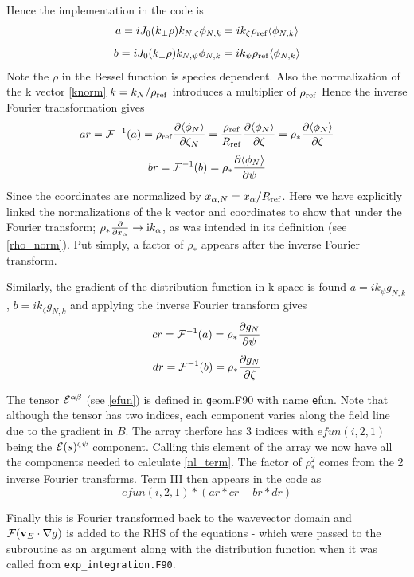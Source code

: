 \documentclass{report}
\def\be{\begin{equation}}
\def\ee{\end{equation}}
\begin{document}
Hence the implementation in the code is
\be
a = i J_{0}(k_{\perp}\rho) k_{N,\zeta} \phi_{N,k} = ik_{\zeta}\rho_{\rm ref}{\langle \phi_{N,k} \rangle} 
\ee
\be
b = i J_{0}(k_{\perp}\rho) k_{N,\psi} \phi_{N,k} = ik_{\psi}\rho_{\rm ref}{\langle \phi_{N,k} \rangle} 
\ee
Note the $\rho$ in the Bessel function is species dependent.  Also the normalization of the k vector \ref{knorm} $k = {k_N / \rho_{\rm ref}}$ introduces a multiplier of $\rho_{\rm ref}$
Hence the inverse Fourier transformation gives
\be
ar = \mathcal{F}^{-1}(a) =  \rho_{\rm ref} {\partial {\langle \phi_N \rangle} \over \partial \zeta_{N}} = {\rho_{\rm ref} \over R_{\rm ref}} {\partial {\langle \phi_N \rangle} \over \partial \zeta} =  \rho_* {\partial {\langle \phi_N \rangle} \over \partial \zeta}
\ee
\be
br = \mathcal{F}^{-1}(b) =  \rho_* {\partial {\langle \phi_N \rangle} \over \partial \psi}
\ee
Since the coordinates are normalized by $x_{\alpha,N} = {x_{\alpha} \slash R_{\rm ref}}$.  Here we have explicitly linked the normalizations of the k vector and coordinates to show that under the Fourier transform; $\rho_* {\partial \over \partial x_\alpha} \rightarrow {\rm i} k_\alpha$, as was intended in its definition (see \ref{rho_norm}). Put simply, a factor of $\rho_{*}$ appears after the inverse Fourier transform.

Similarly, the gradient of the distribution function in k space is found $a = i k_\psi g_{N,k}$, $b = i k_\zeta g_{N,k}$
and applying the inverse Fourier transform gives
\be
cr = \mathcal{F}^{-1}(a) = \rho_* {\partial g_N \over \partial \psi}
\ee
\be
dr = \mathcal{F}^{-1}(b) = \rho_* {\partial g_N \over \partial \zeta}
\ee

The tensor ${\cal E}^{\alpha \beta}$ (see \ref{efun}) is defined in {\texttt geom.F90} with name  {\texttt efun}. Note that although the tensor has two indices, each component varies along the field line due to the gradient in $B$. The array therfore has 3 indices with $efun{(i,2,1)}$ being the ${\cal E}(s)^{\zeta \psi}$ component. Calling this element of the array we now have all the components needed to calculate \ref{nl_term}.  The factor of $\rho_*^2$ comes from the 2 inverse Fourier transforms.  Term III then appears in the code as
\be
efun(i,2,1)*({ar*cr-br*dr})
\ee

Finally this is Fourier transformed back to the wavevector domain and $\mathcal{F}({\bf v}_E \cdot \nabla g)$ is added to the RHS of the equations -  which were passed to the subroutine as an argument along with the distribution function when it was called from \texttt{exp\_integration.F90}.
\end{document}
